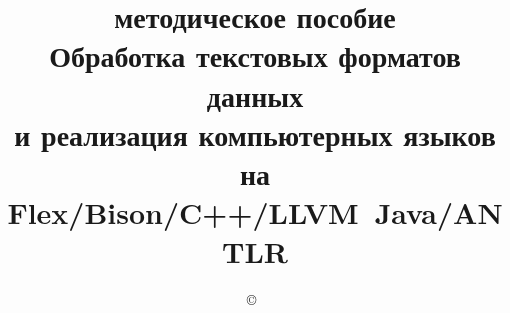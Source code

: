 
\title{{\small методическое пособие}\\Обработка текстовых форматов данных\\
и реализация компьютерных языков\\на 
Flex/Bison/C++/LLVM~{\small Java/ANTLR}\\}
\author{\copyright\ }

\maketitle

\tableofcontents
\secdown






